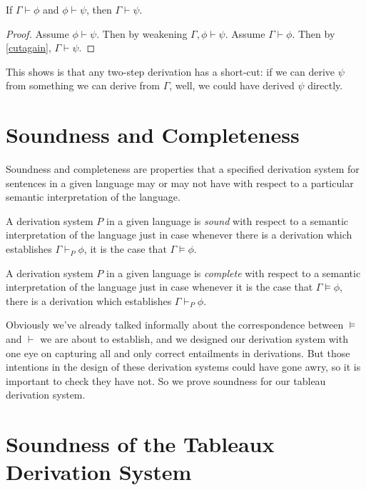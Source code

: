 \begin{theorem} \label{transder}
If $\Gamma \vdash \phi$ and $\phi \vdash \psi$, then $\Gamma \vdash \psi$.
\end{theorem}
\begin{proof}
Assume $\phi\vdash \psi$. Then by weakening $\Gamma,\phi \vdash \psi$. Assume $\Gamma\vdash \phi$. Then by \autoref{cutagain}, $\Gamma\vdash \psi$.
\end{proof}
This shows is that any two-step derivation has a short-cut: if we can derive $\psi$ from something we can derive from $\Gamma$, well, we could have derived $\psi$ directly.

\section{Soundness and Completeness} \label{sec:tsoundcomp}
Soundness and completeness are properties that a specified derivation system for sentences in a given language may or may not have with respect to a particular semantic interpretation of the language.
\begin{definition}[Soundness] \label{def:soundness}
	A derivation system $P$ in a given language is \emph{sound} with respect to a semantic interpretation of the language just in case whenever there is a derivation which establishes $\Gamma \vdash_{P} \phi$, it is the case that $\Gamma \vDash \phi$.
\end{definition}
\begin{definition}[Completeness] \label{def:completeness}
	A derivation system $P$ in a given language is \emph{complete} with respect to a semantic interpretation of the language just in case whenever it is the case that $\Gamma \vDash \phi$, there is a derivation which establishes $\Gamma \vdash_{P} \phi$.
\end{definition}

Obviously we've already talked informally about the correspondence between $\vDash$ and $\vdash$ we are about to establish, and we designed our derivation system with one eye on capturing all and only correct entailments in derivations. But those intentions in the design of these derivation systems could have gone awry, so it is important to check they have not. So we prove soundness for our tableau derivation system.


\section{Soundness of the Tableaux Derivation System}

